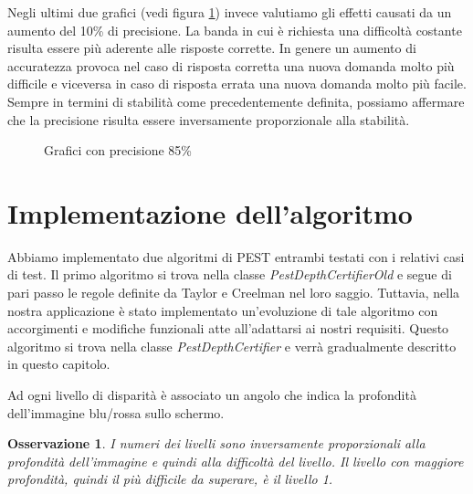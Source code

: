 \documentclass[
	corpo=12pt,
	twoside,
 	evenboxes,
	tipotesi=triennale,
    	stile=classica,
   	 greek,
]{toptesi}
\newtheorem{osservazione}{Osservazione}
\begin{document}
Negli ultimi due grafici (vedi figura \ref{fig:pest_acc85}) invece valutiamo gli effetti causati da un aumento del 10\% di precisione. La banda  in cui è richiesta una difficoltà costante risulta essere più aderente alle risposte corrette. In genere un aumento di accuratezza provoca nel caso di risposta corretta una nuova domanda molto più difficile e viceversa in caso di risposta errata una nuova domanda molto più facile. Sempre in termini di stabilità come precedentemente definita, possiamo affermare che la precisione risulta essere inversamente proporzionale alla stabilità.

\begin{figure}[H]
\centering
{}
\caption{Grafici con precisione 85\%}
\label{fig:pest_acc85}
\end{figure}

\vfill

\newpage

\section{Implementazione dell'algoritmo}
\label{sec:implementazionedellalgoritmo}

Abbiamo implementato due algoritmi di PEST entrambi testati con i relativi casi di test. Il primo algoritmo si trova nella classe \textit{PestDepthCertifierOld} e segue di pari passo le regole definite da Taylor e Creelman nel loro saggio.
Tuttavia, nella nostra applicazione è stato implementato un'evoluzione di tale algoritmo con accorgimenti e modifiche funzionali atte all'adattarsi ai nostri requisiti. Questo algoritmo si trova nella classe \textit{PestDepthCertifier} e verrà gradualmente descritto in questo capitolo.

Ad ogni livello di disparità è associato un angolo che indica la profondità dell'immagine blu/rossa sullo schermo. 

\begin{osservazione}\normalfont
I numeri dei livelli sono inversamente proporzionali alla profondità dell'immagine e quindi alla difficoltà del livello. Il livello con maggiore profondità, quindi il più difficile da superare, è il livello 1.
\end{osservazione}
\end{document}
